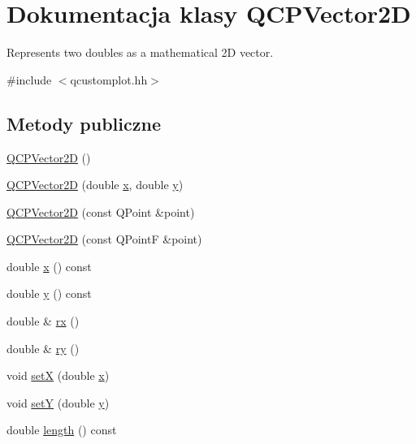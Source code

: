 \hypertarget{class_q_c_p_vector2_d}{}\section{Dokumentacja klasy Q\+C\+P\+Vector2D}
\label{class_q_c_p_vector2_d}


Represents two doubles as a mathematical 2D vector.  




{\ttfamily \#include $<$qcustomplot.\+hh$>$}

\subsection*{Metody publiczne}
\begin{DoxyCompactItemize}
\item 
\hyperlink{class_q_c_p_vector2_d_a04c90748c3623044c79fa20788ffbcc6}{Q\+C\+P\+Vector2D} ()
\item 
\hyperlink{class_q_c_p_vector2_d_a47bd86cebc5588dad6ec84349d9098d4}{Q\+C\+P\+Vector2D} (double \hyperlink{class_q_c_p_vector2_d_a731b487c2bf4afb5c51937619a27d49e}{x}, double \hyperlink{class_q_c_p_vector2_d_a9755d2fbdf959198b394b1ec5a7d022e}{y})
\item 
\hyperlink{class_q_c_p_vector2_d_ad8f30a064dc37c90a7ba5e6732ceb5bb}{Q\+C\+P\+Vector2D} (const Q\+Point \&point)
\item 
\hyperlink{class_q_c_p_vector2_d_a3c16eba1006c210ffc3299253fef2339}{Q\+C\+P\+Vector2D} (const Q\+PointF \&point)
\item 
double \hyperlink{class_q_c_p_vector2_d_a731b487c2bf4afb5c51937619a27d49e}{x} () const 
\item 
double \hyperlink{class_q_c_p_vector2_d_a9755d2fbdf959198b394b1ec5a7d022e}{y} () const 
\item 
double \& \hyperlink{class_q_c_p_vector2_d_a1516252dac9eb5ffb7ddb17fb26e60e0}{rx} ()
\item 
double \& \hyperlink{class_q_c_p_vector2_d_aa8f59a5b54aec8be8e4d1f39db892fea}{ry} ()
\item 
void \hyperlink{class_q_c_p_vector2_d_ab4249e6ce7bfc37be56f014c54b761ae}{setX} (double \hyperlink{class_q_c_p_vector2_d_a731b487c2bf4afb5c51937619a27d49e}{x})
\item 
void \hyperlink{class_q_c_p_vector2_d_ada288019aa8cd51e3b30acfc07b461dc}{setY} (double \hyperlink{class_q_c_p_vector2_d_a9755d2fbdf959198b394b1ec5a7d022e}{y})
\item 
double \hyperlink{class_q_c_p_vector2_d_a27fa0549db12b6f204582f8119627d6a}{length} () const 

\end{DoxyCompactItemize}
